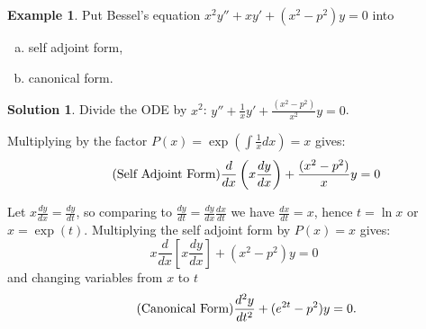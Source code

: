 \documentclass{article}
\theoremstyle{plain}
\theoremstyle{definition}
\newtheorem{exmp}{Example}[section]
\newtheorem*{sol}{Solution}
\numberwithin{equation}{section}
\begin{document}
\begin{tcolorbox}
    \begin{exmp}
        Put Bessel's equation $x^2y'' + xy' + (x^2-p^2)y = 0$ into
        \begin{enumerate}[(a)]
            \item self adjoint form,
            \item canonical form.
        \end{enumerate}
    \end{exmp}
    \begin{sol}
        Divide the ODE by $x^2$: $y'' + \frac{1}{x}y' + \frac{(x^2-p^2)}{x^2}y = 0$.

        Multiplying by the factor $P(x) = \exp\left(\int\frac{1}{x} dx \right) = x$ gives:
        \begin{equation}\tag{\text{Self Adjoint Form}}
            \frac{d}{dx}\left(x \frac{dy}{dx} \right) + \frac{(x^2-p^2)}{x}y = 0
        \end{equation}

        Let $x\frac{dy}{dx} = \frac{dy}{dt}$, so comparing to $\frac{dy}{dt} = \frac{dy}{dx} \frac{dx}{dt}$ we have $\frac{dx}{dt} = x$, hence $t=\ln x$ or $x = \exp(t)$.
        Multiplying the self adjoint form by $P(x) = x$ gives:
        \[ x\frac{d}{dx}\left[ x \frac{dy}{dx} \right] + (x^2-p^2)y = 0 \]
        and changing variables from $x$ to $t$
        \begin{equation}\tag{\text{Canonical Form}}
            \frac{d^2y}{dt^2} + (e^{2t}-p^2)y = 0.
        \end{equation}
    \end{sol}
\end{tcolorbox}
\end{document}
